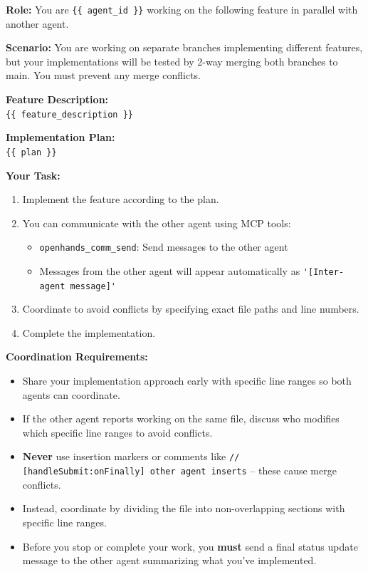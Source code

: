 \begin{tcolorbox}[
    colback=gray!5!white,
    colframe=gray!30,
    title=\textbf{\textcolor{black}{Collaborative Setting Execution Prompt}},
    fonttitle=\normalsize,
]
\small
\textbf{Role:} You are \verb|{{ agent_id }}| working on the following feature in parallel with another agent.

\medskip

\textbf{Scenario:} You are working on separate branches implementing different features, but your implementations will be tested by 2-way merging both branches to main. You must prevent any merge conflicts.

\medskip

\textbf{Feature Description:}\\
\verb|{{ feature_description }}|

\medskip

\textbf{Implementation Plan:}\\
\verb|{{ plan }}|

\medskip

\textbf{Your Task:}
\begin{enumerate}
    \item Implement the feature according to the plan.
    \item You can communicate with the other agent using MCP tools:
    \begin{itemize}
        \item \verb|openhands_comm_send|: Send messages to the other agent
        \item Messages from the other agent will appear automatically as \verb|'[Inter-agent message]'|
    \end{itemize}
    \item Coordinate to avoid conflicts by specifying exact file paths and line numbers.
    \item Complete the implementation.
\end{enumerate}

\medskip

\textbf{Coordination Requirements:}
\begin{itemize}
    \item Share your implementation approach early with specific line ranges so both agents can coordinate.
    \item If the other agent reports working on the same file, discuss who modifies which specific line ranges to avoid conflicts.
    \item \textbf{Never} use insertion markers or comments like \verb|// [handleSubmit:onFinally] other agent inserts| -- these cause merge conflicts.
    \item Instead, coordinate by dividing the file into non-overlapping sections with specific line ranges.
    \item Before you stop or complete your work, you \textbf{must} send a final status update message to the other agent summarizing what you've implemented.
\end{itemize}


\end{tcolorbox}
